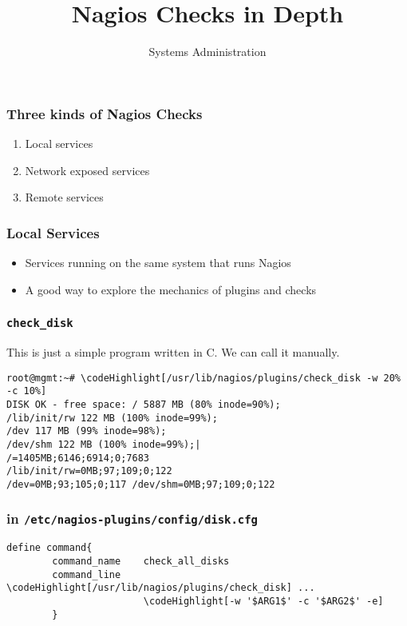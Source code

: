 \documentclass[10pt]{beamer}
\title{Nagios Checks in Depth}
\author[IN719]{Systems Administration}
\institute[Otago Polytechnic]{
  School of Information Technology \\
  Otago Polytechnic \\
  Dunedin, New Zealand \\
}
\date{}
\newcommand\codeHighlight[1]{\textcolor[rgb]{1,0,0}{\textbf{#1}}}
\begin{document}
\begin{frame}[plain]
  \titlepage
\end{frame}

\begin{frame}
  \frametitle{Three kinds of Nagios Checks}


\begin{enumerate}
  \item Local services
  \item Network exposed services
  \item Remote services
\end{enumerate}

\end{frame}

\begin{frame}
  \frametitle{Local Services}


\begin{itemize}
  \item Services running on the same system that runs Nagios
  \item A good way to explore the mechanics of plugins and checks
\end{itemize}

\end{frame}

\begin{frame}[fragile]
  \frametitle{\texttt{check\_disk}}

  This is just a simple program written in C.  We can call it manually.
\begin{Verbatim}[commandchars=\\\[\]]
root@mgmt:~# \codeHighlight[/usr/lib/nagios/plugins/check_disk -w 20% -c 10%]
DISK OK - free space: / 5887 MB (80% inode=90%);
/lib/init/rw 122 MB (100% inode=99%);
/dev 117 MB (99% inode=98%);
/dev/shm 122 MB (100% inode=99%);|
/=1405MB;6146;6914;0;7683
/lib/init/rw=0MB;97;109;0;122
/dev=0MB;93;105;0;117 /dev/shm=0MB;97;109;0;122
\end{Verbatim}
\end{frame}

\begin{frame}[fragile]
  \frametitle{in \texttt{/etc/nagios-plugins/config/disk.cfg}}

\begin{Verbatim}[commandchars=\\\[\]]
define command{
        command_name    check_all_disks
        command_line    \codeHighlight[/usr/lib/nagios/plugins/check_disk] ...
                        \codeHighlight[-w '$ARG1$' -c '$ARG2$' -e]
        }

\end{Verbatim}
\end{frame}
\end{document}
